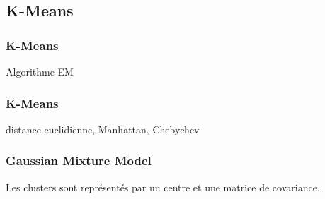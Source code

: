 \subsection{K-Means}

\begin{frame}
  \frametitle{K-Means}
  Algorithme EM
\end{frame}

\begin{frame}
  \frametitle{K-Means}
  distance euclidienne, Manhattan, Chebychev
\end{frame}

\begin{frame}
  \frametitle{Gaussian Mixture Model}
  Les clusters sont représentés par un centre et une matrice de covariance.
\end{frame}
